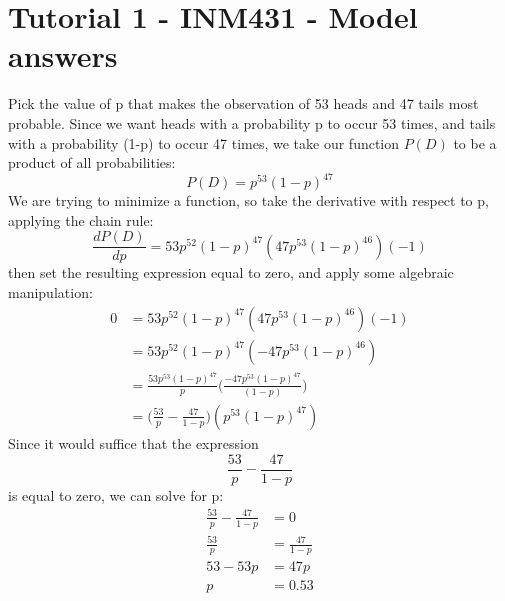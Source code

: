 \documentclass{article}
\begin{document}
\section*{Tutorial 1 - INM431 - Model answers}
Pick the value of p that makes the observation of 53 heads and 47 tails most probable.   
Since we want heads with a probability p to occur 53 times, and tails with a probability (1-p) to occur 47 times, we take our function $P(D)$  to be a product of all probabilities:
\begin{equation}
    P(D) = p^{53}(1-p)^{47}
\end{equation}
We are trying to minimize a function, so take the derivative with respect to p, applying the chain rule:
$$
\frac{dP(D)}{dp}=53p^{52}(1-p)^{47}(47p^{53}(1-p)^{46})(-1)
$$
then set the resulting expression equal to zero, and apply some algebraic manipulation:
\begin{align*}
0 & = 53p^{52}(1-p)^{47}(47p^{53}(1-p)^{46})(-1)  \\
& = 53p^{52}(1-p)^{47}(-47p^{53}(1-p)^{46}) \\
& = \frac{53p^{53}(1-p)^{47}}{p}\Bigg(\frac{-47p^{53}(1-p)^{47}}{(1-p)}\Bigg) \\
& = \Bigg(\frac{53}{p}-\frac{47}{1-p}\Bigg)(p^{53}(1-p)^{47})
\end{align*}
Since it would suffice that the expression
$$
\frac{53}{p}-\frac{47}{1-p}
$$
is equal to zero, we can solve for p:
\begin{align*}
\frac{53}{p}-\frac{47}{1-p} & = 0 \\
\frac{53}{p} & = \frac{47}{1-p} \\
53 - 53p & = 47p \\
p & = 0.53 \\
\end{align*}
\end{document}
